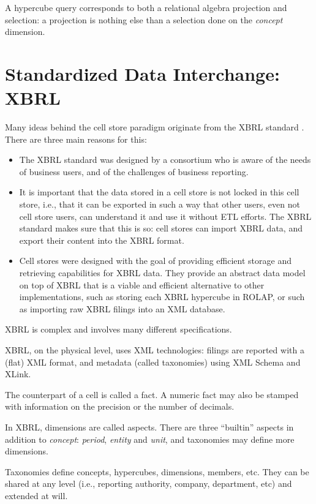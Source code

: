 \documentclass{acm_proc_article-sp}
\begin{document}
A hypercube query corresponds to both a relational algebra projection and selection: a projection is nothing else than a selection done on the \emph{concept} dimension.

\section{Standardized Data Interchange: XBRL}
\label{section-xbrl-standard}
Many ideas behind the cell store paradigm originate from the XBRL standard \cite{XBRL}. There are three main reasons for this:

\begin{itemize}
\item The XBRL standard was designed by a consortium who is aware of the needs of business users, and of the challenges of business reporting.
\item It is important that the data stored in a cell store is not locked in this cell store, i.e., that it can be exported in such a way that other users, even not cell store users, can understand it and use it without ETL efforts. The XBRL standard makes sure that this is so: cell stores can import XBRL data, and export their content into the XBRL format.
\item Cell stores were designed with the goal of providing efficient storage and retrieving capabilities for XBRL data. They provide an abstract data model on top of XBRL that is a viable and efficient alternative to other implementations, such as storing each XBRL hypercube in ROLAP, or such as importing raw XBRL filings into an XML database.
\end{itemize}

XBRL is complex and involves many different specifications.

XBRL, on the physical level, uses XML technologies: filings are reported with a (flat) XML format, and metadata (called taxonomies) using XML Schema and XLink.

The counterpart of a cell is called a fact. A numeric fact may also be stamped with information on the precision or the number of decimals.

In XBRL, dimensions are called aspects. There are three ``builtin'' aspects in addition to \emph{concept}: \emph{period}, \emph{entity} and \emph{unit}, and taxonomies may define more dimensions.

Taxonomies define concepts, hypercubes, dimensions, members, etc. They can be shared at any level (i.e., reporting authority, company, department, etc) and extended at will.
\end{document}
